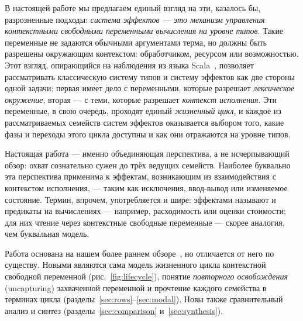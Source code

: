 \documentclass{ProcISPRAS}
\begin{document}
В настоящей работе мы предлагаем единый взгляд на эти, казалось бы, разрозненные
подходы: \emph{система эффектов --- это механизм управления
контекстными свободными переменными вычисления на уровне типов}. Такие переменные не задаются обычными
аргументами терма, но должны быть разрешены окружающим контекстом: обработчиком,
ресурсом или возможностью. Этот взгляд, опирающийся
на наблюдения из языка Scala~\cite{odersky2021safer, boruch2023capturing}, позволяет
рассматривать классическую систему типов и систему эффектов как две стороны одной задачи:
первая имеет дело с переменными, которые разрешает \emph{лексическое окружение},
вторая --- с теми, которые разрешает \emph{контекст исполнения}.
Эти переменные, в свою очередь, проходят единый
\emph{жизненный цикл}, и каждое из рассматриваемых семейств систем эффектов оказывается
выбором того, какие фазы и переходы этого цикла доступны и как они отражаются на уровне типов.

Настоящая работа --- именно объединяющая
перспектива, а не исчерпывающий обзор: охват сознательно сужен до трёх ведущих семейств.
Наиболее буквально эта перспектива применима к эффектам, возникающим из взаимодействия с
контекстом исполнения, --- таким как исключения, ввод-вывод или изменяемое состояние. Термин, впрочем, употребляется и шире:
эффектами называют и предикаты на вычислениях --- например, расходимость или оценки
стоимости; для них чтение через контекстные свободные переменные --- скорее аналогия,
чем буквальная модель.

Работа основана на нашем более раннем обзоре~\cite{stoyan2024modern},
но отличается от него по существу. Новыми являются сама модель жизненного цикла
контекстной свободной переменной (рис.~\ref{fig:lifecycle}), понятие \emph{повторного освобождения} (uncapturing)
захваченной переменной и прочтение каждого
семейства в терминах цикла (разделы~\ref{sec:rows}--\ref{sec:modal}). Новы также
сравнительный анализ и синтез (разделы~\ref{sec:comparison} и~\ref{sec:synthesis}).
\end{document}
